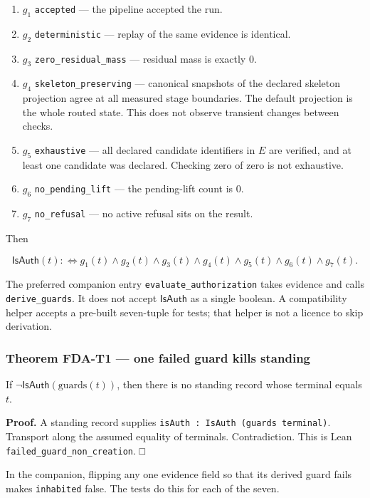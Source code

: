 \documentclass[
  11pt,
]{article}
\providecommand{\tightlist}{%
  \setlength{\itemsep}{0pt}\setlength{\parskip}{0pt}}
\begin{document}
\begin{enumerate}
\def\labelenumi{\arabic{enumi}.}
\tightlist
\item
  \(g_1\) \texttt{accepted} --- the pipeline accepted the run.
\item
  \(g_2\) \texttt{deterministic} --- replay of the same evidence is identical.
\item
  \(g_3\) \texttt{zero\_residual\_mass} --- residual mass is exactly \(0\).
\item
  \(g_4\) \nolinkurl{skeleton_preserving} --- canonical snapshots of the declared skeleton projection agree at all measured stage boundaries. The default projection is the whole routed state. This does not observe transient changes between checks.
\item
  \(g_5\) \texttt{exhaustive} --- all declared candidate identifiers in \(E\) are verified, and at least one candidate was declared. Checking zero of zero is not exhaustive.
\item
  \(g_6\) \texttt{no\_pending\_lift} --- the pending-lift count is \(0\).
\item
  \(g_7\) \texttt{no\_refusal} --- no active refusal sits on the result.
\end{enumerate}

Then

\[
\mathsf{IsAuth}(t)
:\iff
g_1(t)\wedge g_2(t)\wedge g_3(t)\wedge g_4(t)\wedge g_5(t)\wedge g_6(t)\wedge g_7(t).
\]

The preferred companion entry \nolinkurl{evaluate_authorization} takes evidence and calls \texttt{derive\_guards}. It does not accept \(\mathsf{IsAuth}\) as a single boolean. A compatibility helper accepts a pre-built seven-tuple for tests; that helper is not a licence to skip derivation.

\subsubsection{Theorem FDA-T1 --- one failed guard kills standing}\label{theorem-fda-t1-one-failed-guard-kills-standing}

If \(\neg\mathsf{IsAuth}(\mathrm{guards}(t))\), then there is no standing record whose terminal equals \(t\).

\textbf{Proof.} A standing record supplies \texttt{isAuth\ :\ IsAuth\ (guards\ terminal)}. Transport along the assumed equality of terminals. Contradiction. This is Lean \nolinkurl{failed_guard_non_creation}. □

In the companion, flipping any one evidence field so that its derived guard fails makes \texttt{inhabited} false. The tests do this for each of the seven.
\end{document}
